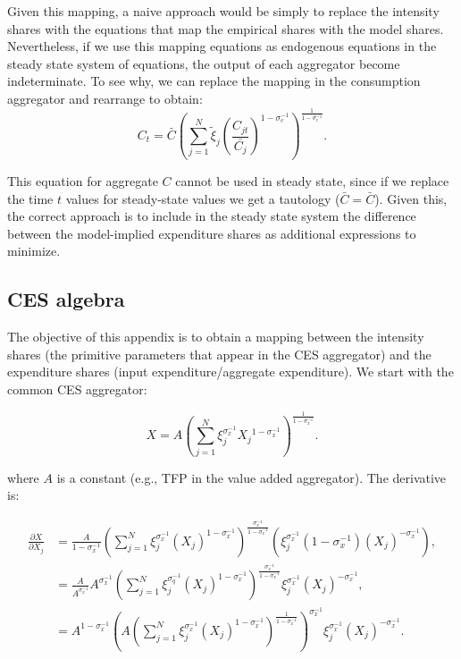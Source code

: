 Given this mapping, a naive approach would be simply to replace the
intensity shares with the equations that map the empirical shares
with the model shares. Nevertheless, if we use this mapping equations
as endogenous equations in the steady state system of equations, the
output of each aggregator become indeterminate. To see why, we can
replace the mapping in the consumption aggregator and rearrange to
obtain:
\[
C_{t}=\bar{{C}}\left(\sum_{j=1}^{N}\tilde{{\xi}}_{j}\left(\frac{C_{jt}}{\bar{{C}_{j}}}\right)^{1-\sigma_{c}^{-1}}\right)^{\frac{1}{1-\sigma_{c}^{-1}}}.
\]

This equation for aggregate $C$ cannot be used in steady state, since
if we replace the time $t$ values for steady-state values we get
a tautology ($\bar{{C}}=\bar{{C}}$). Given this, the correct approach
is to include in the steady state system the difference between the
model-implied expenditure shares as additional expressions to minimize.


\subsection{CES algebra \label{subsec:Norm-CES-algebra}}

The objective of this appendix is to obtain a mapping between the intensity
shares (the primitive parameters that appear in the CES aggregator) and the expenditure shares (input expenditure/aggregate expenditure). We start with the common CES aggregator:

\[
X=A\left(\sum_{j=1}^{N}\xi_{j}^{\sigma_{x}^{-1}}X_{j}{}^{1-\sigma_{x}^{-1}}\right)^{\frac{1}{1-\sigma_{x}^{-1}}}.
\]

where $A$ is a constant (e.g., TFP in the value added aggregator).
The derivative is:

\begin{align*}
\frac{\partial X}{\partial X_{j}} & =\frac{A}{1-\sigma_{x}^{-1}}\left(\sum_{j=1}^{N}\xi_{j}^{\sigma_{x}^{-1}}(X_{j})^{1-\sigma_{x}^{-1}}\right)^{\frac{\sigma_{x}^{-1}}{1-\sigma_{x}^{-1}}}\left(\xi_{j}^{\sigma_{x}^{-1}}\left(1-\sigma_{x}^{-1}\right)(X_{j})^{-\sigma_{x}^{-1}}\right),\\
 & =\frac{A}{A^{\sigma_{x}^{-1}}}A^{\sigma_{x}^{-1}}\left(\sum_{j=1}^{N}\xi_{j}^{\sigma_{q}^{-1}}(X_{j})^{1-\sigma_{x}^{-1}}\right)^{\frac{\sigma_{x}^{-1}}{1-\sigma_{x}^{-1}}}\xi_{j}^{\sigma_{x}^{-1}}(X_{j})^{-\sigma_{x}^{-1}},\\
 & =A^{1-\sigma_{x}^{-1}}\left(A\left(\sum_{j=1}^{N}\xi_{j}^{\sigma_{x}^{-1}}(X_{j})^{1-\sigma_{x}^{-1}}\right)^{\frac{{1}}{1-\sigma_{x}^{-1}}}\right)^{\sigma_{x}^{-1}}\xi_{j}^{\sigma_{x}^{-1}}(X_{j})^{-\sigma_{x}^{-1}}.
\end{align*}

